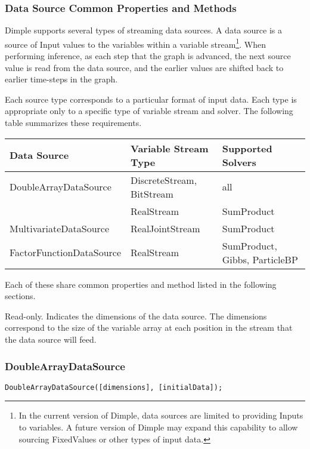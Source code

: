 \subsubsection{Data Source Common Properties and Methods}
\label{sec:DataSource}

Dimple supports several types of streaming data sources.  A data source is a source of Input values to the variables within a variable stream\footnote{In the current version of Dimple, data sources are limited to providing Inputs to variables.  A future version of Dimple may expand this capability to allow sourcing FixedValues or other types of input data.}.  When performing inference, as each step that the graph is advanced, the next source value is read from the data source, and the earlier values are shifted back to earlier time-steps in the graph.

Each source type corresponds to a particular format of input data.  Each type is appropriate only to a specific type of variable stream and solver.  The following table summarizes these requirements.

\begin{longtable} {l | l | l}
Data Source & Variable Stream Type & Supported Solvers \\
\hline
\endhead
DoubleArrayDataSource & DiscreteStream, BitStream & all \\
 & RealStream & SumProduct \\
MultivariateDataSource & RealJointStream & SumProduct \\
FactorFunctionDataSource & RealStream & SumProduct, Gibbs, ParticleBP \\
\end{longtable} 

Each of these share common properties and method listed in the following sections.


\ifmatlab
{}

Read-only.  Indicates the dimensions of the data source.  The dimensions correspond to the size of the variable array at each position in the stream that the data source will feed.
\fi

\subsubsection{DoubleArrayDataSource}


\ifmatlab
\begin{lstlisting}
DoubleArrayDataSource([dimensions], [initialData]);
\end{lstlisting}

